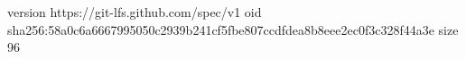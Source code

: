 version https://git-lfs.github.com/spec/v1
oid sha256:58a0c6a6667995050c2939b241cf5fbe807ccdfdea8b8eee2ec0f3c328f44a3e
size 96
